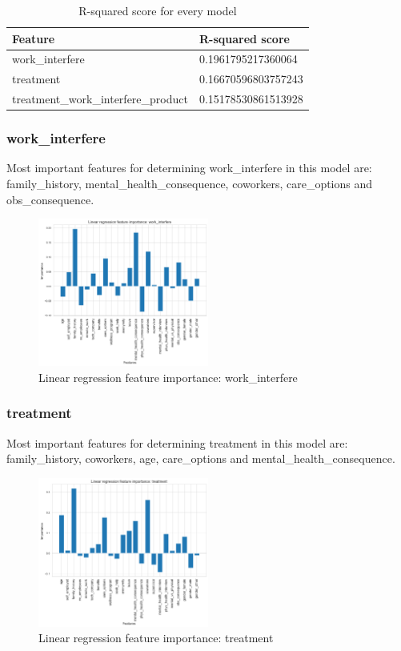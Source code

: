 \documentclass[conference]{IEEEtran}
\begin{document}
\begin{table}[h]
\centering
\begin{tabular}{|l|l|}
\hline
\textbf{Feature}                    & \textbf{R-squared score} \\ \hline
work\_interfere                     & 0.1961795217360064       \\ \hline
treatment                           & 0.16670596803757243      \\ \hline
treatment\_work\_interfere\_product & 0.15178530861513928      \\ \hline
\end{tabular}
\caption{R-squared score for every model}
\label{tab:r-squared-scores}
\end{table}

\subsubsection{\textbf{work\_interfere}}
Most important features for determining work\_interfere in this model are: family\_history, mental\_health\_consequence, coworkers, care\_options and obs\_consequence.
\begin{figure}[H]
    \includegraphics[width=0.5\textwidth]{images/lin-reg-work-interfere.png}
    \centering
    \caption{Linear regression feature importance: work\_interfere}
\end{figure}

\subsubsection{\textbf {treatment}}
Most important features for determining treatment in this model are: family\_history, coworkers, age, care\_options and mental\_health\_consequence.
\begin{figure}[H]
    \includegraphics[width=0.5\textwidth]{images/lin-reg-treatment.png}
    \centering
    \caption{Linear regression feature importance: treatment}
\end{figure}
\end{document}
